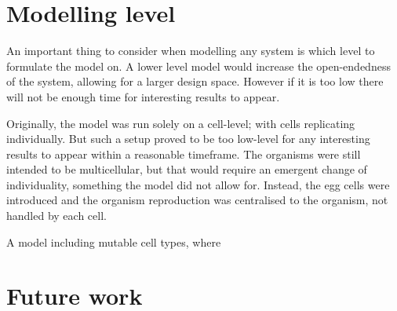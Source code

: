 \section{Modelling level}
An important thing to consider when modelling any system is which level to formulate the model on. A lower level model would increase the open-endedness of the system, allowing for a larger design space. However if it is too low there will not be enough time for interesting results to appear.

Originally, the model was run solely on a cell-level; with cells replicating individually. But such a setup proved to be too low-level for any interesting results to appear within a reasonable timeframe. The organisms were still intended to be multicellular, but that would require an emergent change of individuality, something the model did not allow for. Instead, the egg cells were introduced and the organism reproduction was centralised to the organism, not handled by each cell.

A model including mutable cell types, where 

\section{Future work} %


